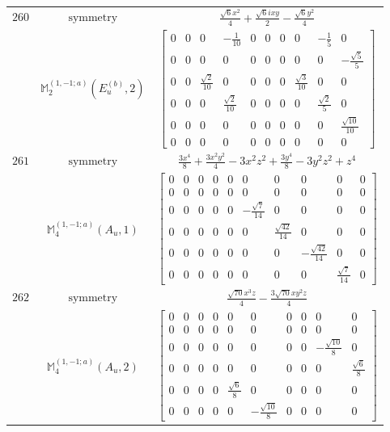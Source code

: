 \documentclass[fleqn,8pt,landscape]{jsarticle}
\begin{document}
\begin{longtable}{ccc}
$ 260 $ & $ \text{symmetry} $ & $ \frac{\sqrt{6} x^{2}}{4} + \frac{\sqrt{6} i x y}{2} - \frac{\sqrt{6} y^{2}}{4} $ \\
$  $ & $ \mathbb{M}_{2}^{(1,-1;a)}(E_{u}^{(b)},2) $ & $ \begin{bmatrix} 0 & 0 & 0 & - \frac{1}{10} & 0 & 0 & 0 & 0 & - \frac{1}{5} & 0 \\ 0 & 0 & 0 & 0 & 0 & 0 & 0 & 0 & 0 & - \frac{\sqrt{5}}{5} \\ 0 & 0 & \frac{\sqrt{2}}{10} & 0 & 0 & 0 & 0 & \frac{\sqrt{3}}{10} & 0 & 0 \\ 0 & 0 & 0 & \frac{\sqrt{2}}{10} & 0 & 0 & 0 & 0 & \frac{\sqrt{2}}{5} & 0 \\ 0 & 0 & 0 & 0 & 0 & 0 & 0 & 0 & 0 & \frac{\sqrt{10}}{10} \\ 0 & 0 & 0 & 0 & 0 & 0 & 0 & 0 & 0 & 0 \end{bmatrix} $ \\ \hline
$ 261 $ & $ \text{symmetry} $ & $ \frac{3 x^{4}}{8} + \frac{3 x^{2} y^{2}}{4} - 3 x^{2} z^{2} + \frac{3 y^{4}}{8} - 3 y^{2} z^{2} + z^{4} $ \\
$  $ & $ \mathbb{M}_{4}^{(1,-1;a)}(A_{u},1) $ & $ \begin{bmatrix} 0 & 0 & 0 & 0 & 0 & 0 & 0 & 0 & 0 & 0 \\ 0 & 0 & 0 & 0 & 0 & 0 & 0 & 0 & 0 & 0 \\ 0 & 0 & 0 & 0 & 0 & - \frac{\sqrt{7}}{14} & 0 & 0 & 0 & 0 \\ 0 & 0 & 0 & 0 & 0 & 0 & \frac{\sqrt{42}}{14} & 0 & 0 & 0 \\ 0 & 0 & 0 & 0 & 0 & 0 & 0 & - \frac{\sqrt{42}}{14} & 0 & 0 \\ 0 & 0 & 0 & 0 & 0 & 0 & 0 & 0 & \frac{\sqrt{7}}{14} & 0 \end{bmatrix} $ \\ \hline
$ 262 $ & $ \text{symmetry} $ & $ \frac{\sqrt{70} x^{3} z}{4} - \frac{3 \sqrt{70} x y^{2} z}{4} $ \\
$  $ & $ \mathbb{M}_{4}^{(1,-1;a)}(A_{u},2) $ & $ \begin{bmatrix} 0 & 0 & 0 & 0 & 0 & 0 & 0 & 0 & 0 & 0 \\ 0 & 0 & 0 & 0 & 0 & 0 & 0 & 0 & 0 & 0 \\ 0 & 0 & 0 & 0 & 0 & 0 & 0 & 0 & - \frac{\sqrt{10}}{8} & 0 \\ 0 & 0 & 0 & 0 & 0 & 0 & 0 & 0 & 0 & \frac{\sqrt{6}}{8} \\ 0 & 0 & 0 & 0 & \frac{\sqrt{6}}{8} & 0 & 0 & 0 & 0 & 0 \\ 0 & 0 & 0 & 0 & 0 & - \frac{\sqrt{10}}{8} & 0 & 0 & 0 & 0 \end{bmatrix} $ \\ \hline

\end{longtable}
\end{document}
